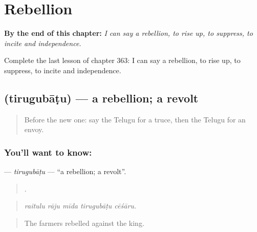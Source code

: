 
\chapter{Rebellion}
\label{ch:te-rebellion}

\begin{chapteropening}
\textbf{By the end of this chapter:} \emph{I can say a rebellion, to rise up, to suppress, to incite and independence.}

Complete the last lesson of chapter 363: I can say a rebellion, to rise up, to suppress, to incite and independence.
\end{chapteropening}

\section[\texorpdfstring{\te{తిరుగుబాటు} (tirugubāṭu)}{తిరుగుబాటు (tirugubāṭu)}]{ (tirugubāṭu) — a rebellion; a revolt}

\label{lesson:TE-C363-tirugubatu}



\begin{quote}
Before the new one: say the Telugu for a truce, then the Telugu for an envoy.
\end{quote}

\subsection*{You'll want to know: }
\textbf{} — \emph{tirugubāṭu} — \textquotedblleft{}a rebellion; a revolt\textquotedblright{}.

\begin{quote}
    .
\end{quote}

\begin{quote}
\emph{raitulu rāju mīda tirugubāṭu cēśāru.}
\end{quote}

\begin{quote}
The farmers rebelled against the king.
\end{quote}

